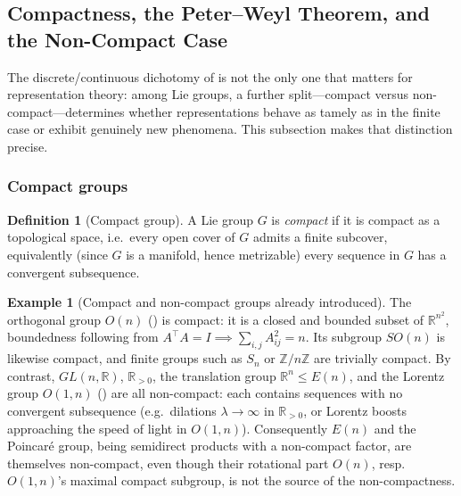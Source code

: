 \documentclass[11pt]{article}
\theoremstyle{plain}
\theoremstyle{definition}
\newtheorem{Definition}{Definition}[section]
\newtheorem{Example}{Example}[section]
\begin{document}

\subsection{Compactness, the Peter--Weyl Theorem, and the Non-Compact Case}
\label{subsec:compactness-peter-weyl}

The discrete/continuous dichotomy of  is not
the only one that matters for representation theory: among Lie groups, a
further split---compact versus non-compact---determines whether
representations behave as tamely as in the finite case or exhibit genuinely
new phenomena. This subsection makes that distinction precise.

\subsubsection{Compact groups}
\label{subsubsec:compact-groups}

\begin{Definition}[Compact group]
\label{def:compact-group}
A Lie group $G$ is \emph{compact} if it is compact as a topological space,
i.e.\ every open cover of $G$ admits a finite subcover, equivalently (since
$G$ is a manifold, hence metrizable) every sequence in $G$ has a convergent
subsequence.
\end{Definition}

\begin{Example}[Compact and non-compact groups already introduced]
\label{ex:compactness}
The orthogonal group $O(n)$ () is compact: it is a
closed and bounded subset of $\mathbb{R}^{n^2}$, boundedness following from
$A^\top A = I \implies \sum_{i,j} A_{ij}^2 = n$. Its subgroup $SO(n)$ is
likewise compact, and finite groups such as $S_n$ or $\mathbb{Z}/n\mathbb{Z}$
are trivially compact. By contrast, $GL(n,\mathbb{R})$, $\mathbb{R}_{>0}$,
the translation group $\mathbb{R}^n \leq E(n)$, and the Lorentz group
$O(1,n)$ () are all non-compact: each contains
sequences with no convergent subsequence (e.g.\ dilations $\lambda \to
\infty$ in $\mathbb{R}_{>0}$, or Lorentz boosts approaching the speed of
light in $O(1,n)$). Consequently $E(n)$ and the Poincar\'e group, being
semidirect products with a non-compact factor, are themselves non-compact,
even though their rotational part $O(n)$, resp.\ $O(1,n)$'s maximal compact
subgroup, is not the source of the non-compactness.
\end{Example}
\end{document}
